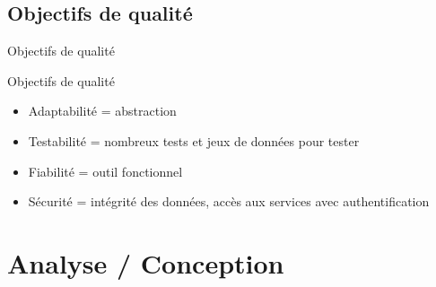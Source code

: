 \documentclass[utf8,compress]{beamer}
\begin{document}
\subsection{Objectifs de qualité}
\begin{frame}{Objectifs de qualité}
\begin{block}{Objectifs de qualité}
\begin{itemize}
\item Adaptabilité = abstraction
\item Testabilité = nombreux tests et jeux de données pour tester
\item Fiabilité = outil fonctionnel
\item Sécurité = intégrité des données, accès aux services avec authentification
\end{itemize}
\end{block}
\end{frame}


\section{Analyse / Conception}
\end{document}
